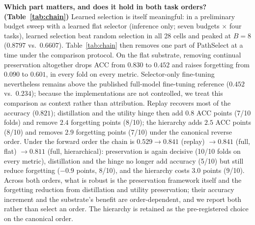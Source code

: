 \documentclass{article}
\begin{document}
\textbf{Which part matters, and does it hold in both task orders? (Table~\ref{tab:chain})}
Learned selection is itself meaningful: in a preliminary budget sweep with a learned flat selector (inference only; seven budgets $\times$ four tasks), learned selection beat random selection in all 28 cells and peaked at $B=8$ ($0.8797$ vs.\ $0.6607$). Table~\ref{tab:chain} then removes one part of PathSelect at a time under the comparison protocol. On the flat substrate, removing continual preservation altogether drops ACC from $0.830$ to $0.452$ and raises forgetting from $0.090$ to $0.601$, in every fold on every metric. Selector-only fine-tuning nevertheless remains above the published full-model fine-tuning reference ($0.452$ vs.\ $0.234$); because the implementations are not controlled, we treat this comparison as context rather than attribution. Replay recovers most of the accuracy ($0.821$); distillation and the utility hinge then add $0.8$ ACC points (7/10 folds) and remove $2.4$ forgetting points (8/10); the hierarchy adds $2.5$ ACC points (8/10) and removes $2.9$ forgetting points (7/10) under the canonical reverse order. Under the forward order the chain is $0.529\rightarrow0.841$ (replay) $\rightarrow0.841$ (full, flat) $\rightarrow0.811$ (full, hierarchical): preservation is again decisive (10/10 folds on every metric), distillation and the hinge no longer add accuracy (5/10) but still reduce forgetting ($-0.9$ points, 8/10), and the hierarchy costs $3.0$ points (9/10). Across both orders, what is robust is the preservation framework itself and the forgetting reduction from distillation and utility preservation; their accuracy increment and the substrate's benefit are order-dependent, and we report both rather than select an order. The hierarchy is retained as the pre-registered choice on the canonical order.

\begin{table}[t]
\centering
\footnotesize
\caption{\textbf{Preservation-component ablation} (flat, fold 1, 5-seed means). Replay restores old-task competence, the utility-preservation hinge preserves functional utility, and distillation stabilizes selection behavior; no single term or pair matches the full set.}
\label{tab:ablation}
\end{table}
\end{document}
